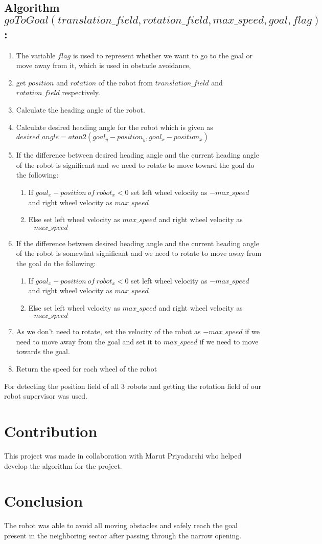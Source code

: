 \documentclass[12pt]{article}
\begin{document}
	\subsection*{Algorithm $goToGoal(translation\_field, rotation\_field, max\_speed, goal, flag)$:}
	\begin{enumerate}
		\item The variable $flag$ is used to represent whether we want to go to the goal or move away from it, which is used in obstacle avoidance,
		\item get $position$ and $rotation$ of the robot from $translation\_field$ and $rotation\_field$ respectively.
		\item Calculate the heading angle of the robot.
		\item Calculate desired heading angle for the robot which is given as $desired\_angle = atan2(goal_y - position_y, goal_x - position_x)$
		\item If the difference between desired heading angle and the current heading angle of the robot is significant and we need to rotate to move toward the goal do the following:
		\begin{enumerate}
			\item If $goal_x - position\ of\ robot_x < 0$ set left wheel velocity as $- max\_speed$ and right wheel velocity as $max\_speed$
			\item Else set left wheel velocity as $max\_speed$ and right wheel velocity as $- max\_speed$
		\end{enumerate}
		\item If the difference between desired heading angle and the current heading angle of the robot is somewhat significant and we need to rotate to move away from the goal do the following:
		\begin{enumerate}
			\item If $goal_x - position\ of\ robot_x < 0$ set left wheel velocity as $- max\_speed$ and right wheel velocity as $max\_speed$
			\item Else set left wheel velocity as $max\_speed$ and right wheel velocity as $- max\_speed$
		\end{enumerate}
		\item As we don't need to rotate, set the velocity of the robot as $-max\_speed$ if we need to move away from the goal and set it to $max\_speed$ if we need to move towards the goal.
		\item Return the speed for each wheel of the robot
	\end{enumerate}
	For detecting the position field of all 3 robots and getting the rotation field of our robot supervisor was used.
	
	
	\section{Contribution}
	This project was made in collaboration with Marut Priyadarshi who helped develop the algorithm for the project.
	\section{Conclusion}
	The robot was able to avoid all moving obstacles and safely reach the goal present in the neighboring sector after passing through the narrow opening.
\end{document}
